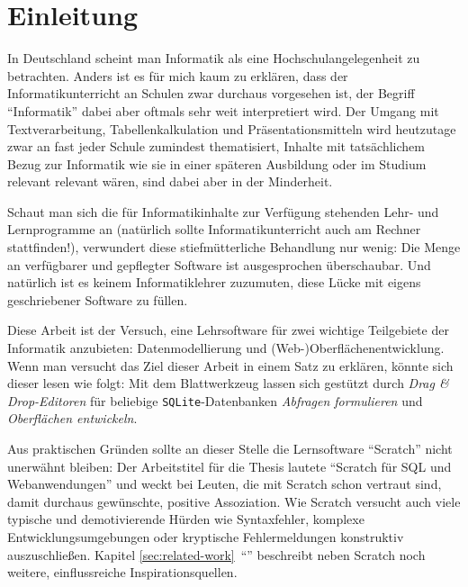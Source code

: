 \section{Einleitung}
\label{sec:introduction}

In Deutschland scheint man Informatik als eine Hochschulangelegenheit zu betrachten. Anders ist es für mich kaum zu erklären, dass der Informatikunterricht an Schulen zwar durchaus vorgesehen ist, der Begriff ``Informatik'' dabei aber oftmals sehr weit interpretiert wird. Der Umgang mit Textverarbeitung, Tabellenkalkulation und Präsentationsmitteln wird heutzutage zwar an fast jeder Schule zumindest thematisiert, Inhalte mit tatsächlichem Bezug zur Informatik wie sie in einer späteren Ausbildung oder im Studium relevant relevant wären, sind dabei aber in der Minderheit.

Schaut man sich die für Informatikinhalte zur Verfügung stehenden Lehr- und Lernprogramme an (natürlich sollte Informatikunterricht auch am Rechner stattfinden!), verwundert diese stiefmütterliche Behandlung nur wenig: Die Menge an verfügbarer und gepflegter Software ist ausgesprochen überschaubar. Und natürlich ist es keinem Informatiklehrer zuzumuten, diese Lücke mit eigens geschriebener Software zu füllen.

Diese Arbeit ist der Versuch, eine Lehrsoftware für zwei wichtige Teilgebiete der Informatik anzubieten: Datenmodellierung und (Web-)Oberflächenentwicklung. Wenn man versucht das Ziel dieser Arbeit in einem Satz zu erklären, könnte sich dieser lesen wie folgt: Mit dem Blattwerkzeug lassen sich gestützt durch \textit{Drag \& Drop-Editoren} für beliebige \texttt{SQLite}-Datenbanken \textit{Abfragen formulieren} und \textit{Oberflächen entwickeln}.


Aus praktischen Gründen sollte an dieser Stelle die Lernsoftware "`Scratch"' nicht unerwähnt bleiben: Der Arbeitstitel für die Thesis lautete "`Scratch für SQL und Webanwendungen"' und weckt bei Leuten, die mit Scratch schon vertraut sind, damit durchaus gewünschte, positive Assoziation. Wie Scratch versucht auch \idename{} viele typische und demotivierende Hürden wie Syntaxfehler, komplexe Entwicklungsumgebungen oder kryptische Fehlermeldungen konstruktiv auszuschließen. Kapitel \ref{sec:related-work}~"`"' beschreibt neben Scratch noch weitere, einflussreiche Inspirationsquellen.

